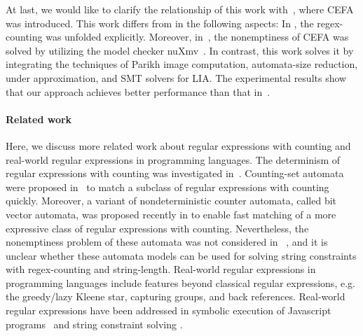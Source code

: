 At last, we would like to clarify the relationship of this work with~\cite{atva2020}, where CEFA was introduced. This work differs from \cite{atva2020} in the following aspects: In \cite{atva2020}, the regex-counting was unfolded explicitly. Moreover, in~\cite{atva2020}, the nonemptiness of CEFA was solved by utilizing the model checker nuXmv~\cite{nuxmv}. In contrast, this work solves it by integrating the techniques of Parikh image computation, automata-size reduction, under approximation, and SMT solvers for LIA. The experimental results show that our approach achieves better performance than that in~\cite{atva2020}. 

\paragraph*{Related work} 
Here, we discuss more related work about regular expressions with counting and real-world regular expressions in programming languages.  
The determinism of regular expressions with counting was investigated in~\cite{GGM12,CL15}. Counting-set automata were proposed in~\cite{redos_lenka,HS+23} to match a subclass of regular expressions with counting quickly. Moreover, a variant of nondeterministic counter automata, called bit vector automata, was proposed recently in \cite{GKM23} to enable fast matching of a more expressive class of regular expressions with counting.   Nevertheless, the nonemptiness problem of these automata was not considered in ~\cite{redos_lenka,HS+23,GKM23}, and it is unclear whether these automata models can be used for solving string constraints with regex-counting and string-length.
Real-world regular expressions in programming languages include features beyond classical regular expressions, e.g. the greedy/lazy Kleene star, capturing groups, and back references. Real-world regular expressions have been addressed in symbolic execution of Javascript programs~\cite{LMK19} and string constraint solving \cite{CF+22}. 

